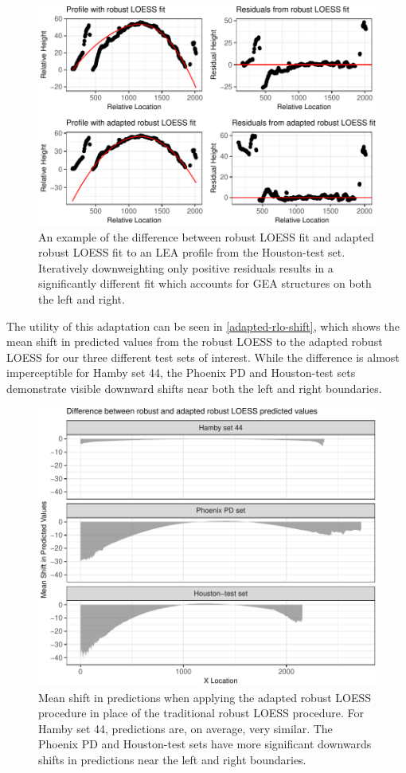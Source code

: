 \documentclass[12pt]{article}
\begin{document}
\begin{figure}
\centering
\includegraphics{writeup_files/figure-latex/houston-adapted-rlo-1.pdf}
\caption{\label{houston-adapted-rlo}An example of the difference between
robust LOESS fit and adapted robust LOESS fit to an LEA profile from the
Houston-test set. Iteratively downweighting only positive residuals
results in a significantly different fit which accounts for GEA
structures on both the left and right.}
\end{figure}

The utility of this adaptation can be seen in
\autoref{adapted-rlo-shift}, which shows the mean shift in predicted
values from the robust LOESS to the adapted robust LOESS for our three
different test sets of interest. While the difference is almost
imperceptible for Hamby set 44, the Phoenix PD and Houston-test sets
demonstrate visible downward shifts near both the left and right
boundaries.

\begin{figure}
\centering
\includegraphics{writeup_files/figure-latex/adapted-rlo-shift-1.pdf}
\caption{\label{adapted-rlo-shift}Mean shift in predictions when
applying the adapted robust LOESS procedure in place of the traditional
robust LOESS procedure. For Hamby set 44, predictions are, on average,
very similar. The Phoenix PD and Houston-test sets have more significant
downwards shifts in predictions near the left and right boundaries.}
\end{figure}
\end{document}
